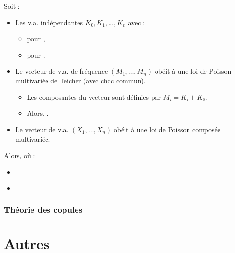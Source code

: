 \documentclass[10pt, french]{article}
\begin{document}
\begin{multicols*}{2}
\begin{definitionNOHFILL}
Soit : 
\begin{itemize}
	\item	Les v.a. indépendantes $K_{0}, K_{1}, \dots, K_{n}$ avec :
		\begin{itemize}
		\item	{} pour , 
		\item	{} pour .
		\end{itemize}
	\item	Le vecteur de v.a. de fréquence $(M_{1}, \dots, M_{n})$ obéit à une loi de Poisson multivariée de Teicher (avec choc commun). 
		\begin{itemize}
		\item	Les composantes du vecteur sont définies par $M_{i}	=	K_{i} + K_{0}$.
		\item	Alors, .
		\end{itemize}
	\item	Le vecteur de v.a. $(X_{1}, \dots, X_{n})$ obéit à une loi de Poisson composée multivariée.
\end{itemize}
Alors,  où :
\begin{itemize}
	\item	{}.
	\item	{}.
\end{itemize}
\end{definitionNOHFILL}



\pagebreak 
\section{Théorie des copules}


\newpage
\part{Autres}

\end{multicols*}
\end{document}
